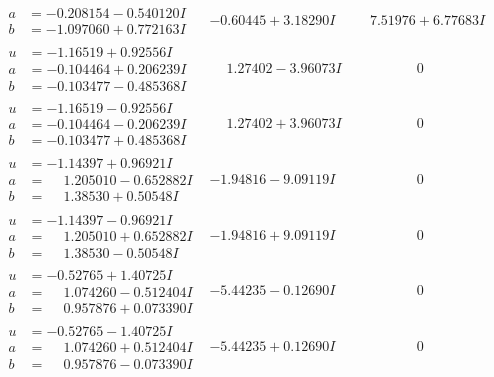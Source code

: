 \documentclass[1p]{elsarticle_modified}
\theoremstyle{definition}
\begin{document}
$$\begin{array}{c|c|c}
\begin{aligned}
a &= -0.208154 - 0.540120 I \\
b &= -1.097060 + 0.772163 I\end{aligned}
 & -0.60445 + 3.18290 I & \phantom{-}7.51976 + 6.77683 I \\ \hline\begin{aligned}
u &= -1.16519 + 0.92556 I \\
a &= -0.104464 + 0.206239 I \\
b &= -0.103477 - 0.485368 I\end{aligned}
 & \phantom{-}1.27402 - 3.96073 I & \phantom{-0.000000 } 0 \\ \hline\begin{aligned}
u &= -1.16519 - 0.92556 I \\
a &= -0.104464 - 0.206239 I \\
b &= -0.103477 + 0.485368 I\end{aligned}
 & \phantom{-}1.27402 + 3.96073 I & \phantom{-0.000000 } 0 \\ \hline\begin{aligned}
u &= -1.14397 + 0.96921 I \\
a &= \phantom{-}1.205010 - 0.652882 I \\
b &= \phantom{-}1.38530 + 0.50548 I\end{aligned}
 & -1.94816 - 9.09119 I & \phantom{-0.000000 } 0 \\ \hline\begin{aligned}
u &= -1.14397 - 0.96921 I \\
a &= \phantom{-}1.205010 + 0.652882 I \\
b &= \phantom{-}1.38530 - 0.50548 I\end{aligned}
 & -1.94816 + 9.09119 I & \phantom{-0.000000 } 0 \\ \hline\begin{aligned}
u &= -0.52765 + 1.40725 I \\
a &= \phantom{-}1.074260 - 0.512404 I \\
b &= \phantom{-}0.957876 + 0.073390 I\end{aligned}
 & -5.44235 - 0.12690 I & \phantom{-0.000000 } 0 \\ \hline\begin{aligned}
u &= -0.52765 - 1.40725 I \\
a &= \phantom{-}1.074260 + 0.512404 I \\
b &= \phantom{-}0.957876 - 0.073390 I\end{aligned}
 & -5.44235 + 0.12690 I & \phantom{-0.000000 } 0 \\ \hline\begin{aligned}

\end{aligned}
\end{array}$$
\end{document}

